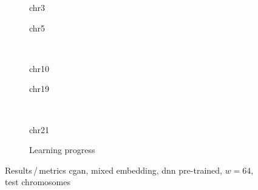 \begin{figure}[p] %
    \begin{subfigure}{0.45\textwidth}
        \scriptsize
        \caption{chr3}
    \end{subfigure} \hfill
    \begin{subfigure}{0.45\textwidth}
        \scriptsize
        \caption{chr5}
    \end{subfigure}\\[5mm]
    \begin{subfigure}{0.45\textwidth}
        \scriptsize
        \caption{chr10}
    \end{subfigure}\hfill
    \begin{subfigure}{0.45\textwidth}
        \scriptsize
        \caption{chr19}
    \end{subfigure}\\[3mm]
    \centering
    \begin{subfigure}{0.45\textwidth}
        \scriptsize
        \caption{chr21}
    \end{subfigure} \hfill
    \begin{subfigure}{0.45\textwidth}
        \scriptsize
        \caption{Learning progress} \label{fig:results:GAN64_pretrained_mixed_lossEpochs}
    \end{subfigure}
    \caption{Results\,/\,metrics \acrshort{cgan}, mixed embedding, \acrshort{dnn} pre-trained, $w=64$, test chromosomes}   \label{fig:results:GAN64_pretrained_mixed_pearson}
\end{figure}
